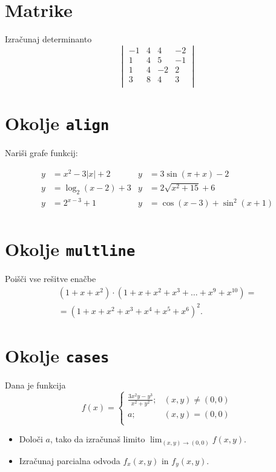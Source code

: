 \documentclass[a4paper,12pt]{article}
\begin{document}
\section*{Matrike}
Izračunaj determinanto
\[
\begin{vmatrix}
    -1 & 4 & 4 & -2 \\
    1 & 4 & 5 & -1 \\
    1 & 4 & -2 & 2 \\
    3 & 8 & 4 & 3 \\
\end{vmatrix}
\]

\section*{Okolje \texttt{align}}
Nariši grafe funkcij:

\begin{align*}
y &= x^2 - 3|x| + 2 & y &= 3 \sin(\pi+x) - 2\\
y &= \log_2(x-2) + 3 & y &= 2 \sqrt{x^2+15} + 6\\
y &= 2^{x-3} + 1 & y &= \cos(x-3) + \sin^2(x+1)\\
\end{align*}


\section*{Okolje \texttt{multline}}
Poišči vse rešitve enačbe
\begin{multline*}
   (1+x+x^2) \cdot (1+x+x^2+x^3+\ldots+x^9+x^{10}) =\\
=(1+x+x^2+x^3+x^4+x^5+x^6)^2.
\end{multline*}

\section*{Okolje \texttt{cases}}
Dana je funkcija
\[
f(x) = \begin{cases}
   \frac{3x^2y-y^3}{x^2+y^2}; &(x,y) \neq (0,0)\\
   a; &(x,y) = (0,0)\\
\end{cases}
\]
\begin{itemize}
\item Določi \(a\), tako da izračunaš limito \( \lim_{(x,y)\to(0,0)} f(x,y) \).
\item Izračunaj parcialna odvoda \(f_x(x,y)\) in \(f_y(x,y)\).
\end{itemize}
\end{document}
